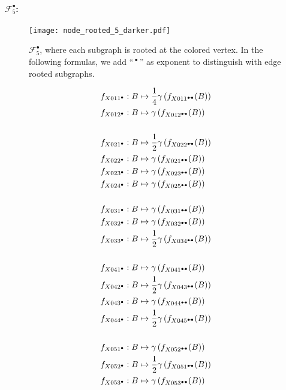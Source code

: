 \documentclass{article}
\theoremstyle{plain}
\begin{document}
\paragraph{$\mathcal{F}_5^\bullet$:}
\begin{figure}
\centering
\texttt{[image: node\_rooted\_5\_darker.pdf]}
\caption{\label{F5n} $\mathcal{F}_5^\bullet$, where each subgraph is rooted at the colored vertex. In the following formulas, we add ``$\,^\bullet\,$'' as exponent to distinguish with edge rooted subgraphs.}
\end{figure}
\begin{align*}
f_{X011^\bullet}: B&\mapsto
 \frac{1}{4}\gamma\left(f_{X011^\dumbbell}(B)\right)\\
f_{X012^\bullet}: B&\mapsto
 \gamma\left(f_{X012^\dumbbell}(B)\right)\\&\\
f_{X021^\bullet}: B&\mapsto
 \frac{1}{2}\gamma\left(f_{X022^\dumbbell}(B)\right)\\
f_{X022^\bullet}: B&\mapsto
 \gamma\left(f_{X021^\dumbbell}(B)\right)\\
f_{X023^\bullet}: B&\mapsto
 \gamma\left(f_{X023^\dumbbell}(B)\right)\\
f_{X024^\bullet}: B&\mapsto
 \gamma\left(f_{X025^\dumbbell}(B)\right)\\&\\
f_{X031^\bullet}: B&\mapsto
 \gamma\left(f_{X031^\dumbbell}(B)\right)\\
f_{X032^\bullet}: B&\mapsto
 \gamma\left(f_{X032^\dumbbell}(B)\right)\\
f_{X033^\bullet}: B&\mapsto
 \frac{1}{2}\gamma\left(f_{X034^\dumbbell}(B)\right)\\&\\
f_{X041^\bullet}: B&\mapsto
 \gamma\left(f_{X041^\dumbbell}(B)\right)\\
f_{X042^\bullet}: B&\mapsto
 \frac{1}{2}\gamma\left(f_{X043^\dumbbell}(B)\right)\\
f_{X043^\bullet}: B&\mapsto
 \gamma\left(f_{X044^\dumbbell}(B)\right)\\
f_{X044^\bullet}: B&\mapsto
 \frac{1}{2}\gamma\left(f_{X045^\dumbbell}(B)\right)\\&\\
f_{X051^\bullet}: B&\mapsto
 \gamma\left(f_{X052^\dumbbell}(B)\right)\\
f_{X052^\bullet}: B&\mapsto
 \frac{1}{2}\gamma\left(f_{X051^\dumbbell}(B)\right)\\
f_{X053^\bullet}: B&\mapsto
 \gamma\left(f_{X053^\dumbbell}(B)\right)\\&\\

\end{align*}
\end{document}
